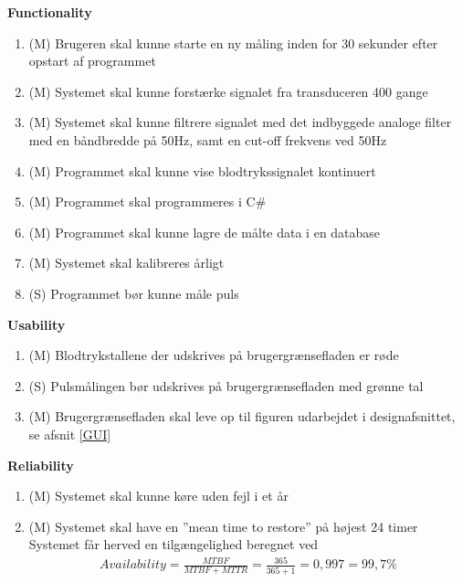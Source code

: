 \textbf{Functionality}\\
\begin{enumerate}
	\item (M) Brugeren skal kunne starte en ny måling inden for 30 sekunder efter opstart af programmet \\
	\item (M) Systemet skal kunne forstærke signalet fra transduceren 400 gange\\
	\item (M) Systemet skal kunne filtrere signalet med det indbyggede analoge filter med en båndbredde på 50Hz, samt en cut-off frekvens ved 50Hz \\
	\item (M) Programmet skal kunne vise blodtrykssignalet kontinuert\\
	\item (M) Programmet skal programmeres i C\#\\
	\item (M) Programmet skal kunne lagre de målte data i en database\\
	\item (M) Systemet skal kalibreres årligt\\
	\item (S) Programmet bør kunne måle puls\\
\end{enumerate}

\textbf{Usability}\\
\begin{enumerate}
	\item (M) Blodtrykstallene der udskrives på brugergrænsefladen er røde\\
	\item (S) Pulsmålingen bør udskrives på brugergrænsefladen med grønne tal\\
	\item (M) Brugergrænsefladen skal leve op til figuren udarbejdet i designafsnittet, se afsnit \ref{GUI} \\
\end{enumerate}

\textbf{Reliability}\\
\begin{enumerate}
	\item (M) Systemet skal kunne køre uden fejl i et år\\
	\item (M) Systemet skal have en ”mean time to restore” på højest 24 timer\\
	\subitem Systemet får herved en tilgængelighed beregnet ved \begin{align}
Availability = \frac{MTBF}{MTBF+MTTR} = \frac{365}{365+1} = 0,997 = 99,7\%
\end{align}\\
\end{enumerate}

